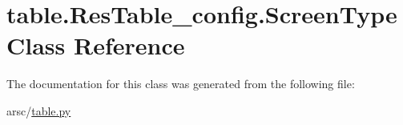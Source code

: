 \hypertarget{classtable_1_1ResTable__config_1_1ScreenType}{}\section{table.\+Res\+Table\+\_\+config.\+Screen\+Type Class Reference}
\label{classtable_1_1ResTable__config_1_1ScreenType}


The documentation for this class was generated from the following file\+:\begin{DoxyCompactItemize}
\item 
arsc/\mbox{\hyperlink{table_8py}{table.\+py}}\end{DoxyCompactItemize}
